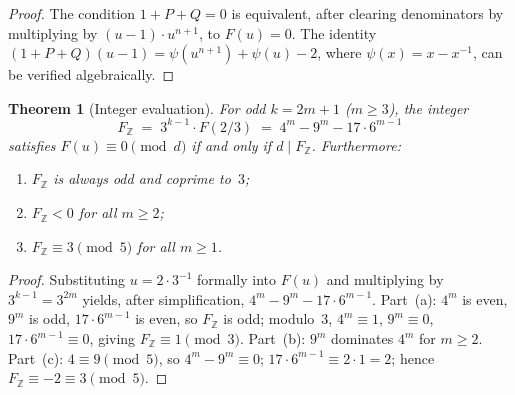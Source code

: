 \documentclass[12pt, a4paper]{amsart}
\theoremstyle{plain}
\newtheorem{theorem}{Theorem}[section]
\theoremstyle{definition}
\theoremstyle{remark}
\newcommand{\Z}{\mathbb{Z}}
\begin{document}
\begin{proof}
  The condition $1 + P + Q = 0$ is equivalent, after
  clearing denominators by multiplying by $(u-1) \cdot u^{n+1}$,
  to $F(u) = 0$.
  The identity $(1 + P + Q)(u - 1) = \psi(u^{n+1}) + \psi(u) - 2$,
  where $\psi(x) = x - x^{-1}$, can be verified algebraically.
\end{proof}

\begin{theorem}[Integer evaluation]\label{thm:FZ}
  For odd $k = 2m + 1$ ($m \geq 3$), the integer
  \begin{equation}\label{eq:FZ}
    F_\Z \;=\; 3^{k-1} \cdot F(2/3)
    \;=\; 4^m - 9^m - 17 \cdot 6^{m-1}
  \end{equation}
  satisfies $F(u) \equiv 0 \pmod{d}$ if and only if
  $d \mid F_\Z$.
  Furthermore:
  \begin{enumerate}[label=\textup{(\alph*)}]
    \item $F_\Z$ is always odd and coprime to~$3$;
    \item $F_\Z < 0$ for all $m \geq 2$;
    \item $F_\Z \equiv 3 \pmod{5}$ for all $m \geq 1$.
  \end{enumerate}
\end{theorem}

\begin{proof}
  Substituting $u = 2 \cdot 3^{-1}$ formally into $F(u)$
  and multiplying by $3^{k-1} = 3^{2m}$ yields,
  after simplification, $4^m - 9^m - 17 \cdot 6^{m-1}$.
  Part~(a): $4^m$ is even, $9^m$ is odd,
  $17 \cdot 6^{m-1}$ is even, so $F_\Z$ is odd; modulo~$3$,
  $4^m \equiv 1$, $9^m \equiv 0$, $17 \cdot 6^{m-1} \equiv 0$,
  giving $F_\Z \equiv 1 \pmod{3}$.
  Part~(b): $9^m$ dominates $4^m$ for $m \geq 2$.
  Part~(c): $4 \equiv 9 \pmod{5}$, so $4^m - 9^m \equiv 0$;
  $17 \cdot 6^{m-1} \equiv 2 \cdot 1 = 2$;
  hence $F_\Z \equiv -2 \equiv 3 \pmod{5}$.
\end{proof}
\end{document}
